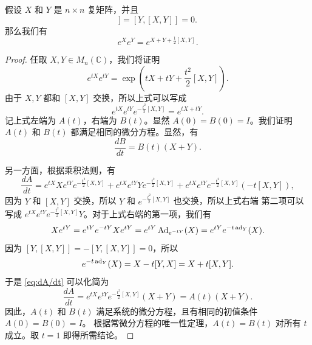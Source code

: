\begin{theorem}\label{thm:BCH-Heisenberg}
  假设 $X$ 和 $Y$ 是 $n\times n$ 复矩阵，并且
  \begin{equation}
    [X,[X,Y]]=[Y,[X,Y]]=0. \label{BCH-condition}
  \end{equation}
  那么我们有
  \[
    e^Xe^Y=e^{X+Y+\frac{1}{2}[X,Y]}.
  \]
\end{theorem}
\begin{proof}
  任取 $X,Y\in M_n(\mathbb{C})$，我们将证明
  \[
    e^{tX}e^{tY}=\exp\left(
      tX+tY+\frac{t^2}{2}[X,Y]
    \right).
  \]
  由于 $X,Y$ 都和 $[X,Y]$ 交换，所以上式可以写成
  \begin{equation}
    e^{tX}e^{tY}e^{-\frac{t^2}{2}[X,Y]}=e^{tX+tY}. \label{BCH-goal}
  \end{equation}
  记上式左端为 $A(t)$，右端为 $B(t)$。显然 $A(0)=B(0)=I$。我们证明
  $A(t)$ 和 $B(t)$ 都满足相同的微分方程。显然，有
  \[
    \frac{dB}{dt}= B(t)(X+Y).
  \]

  另一方面，根据乘积法则，有
  \begin{equation}\label{eq:dA/dt}
    \frac{d A}{dt}=e^{tX}Xe^{tY}e^{-\frac{t^2}{2}[X,Y]}+
    e^{tX}e^{tY}Ye^{-\frac{t^2}{2}[X,Y]}+
    e^{tX}e^{tY}e^{-\frac{t^2}{2}[X,Y]}\left(-t[X,Y]\right),
  \end{equation}
  因为 $Y$ 和 $[X,Y]$ 交换，所以 $Y$ 和 $e^{-\frac{t^2}{2}[X,Y]}$ 也交换，所以上式右端
  第二项可以写成 $e^{tX}e^{tY}e^{-\frac{t^2}{2}[X,Y]}Y$。对于上式右端的第一项，我们有
  \[
    Xe^{tY}=e^{tY}e^{-tY}Xe^{tY}=e^{tY}\operatorname{Ad}_{e^{-tY}}(X)
    =e^{tY}e^{-t\operatorname{ad}_Y}(X).
  \]
  因为 $[Y,[X,Y]]=-[Y,[X,Y]]=0$，所以
  \[
    e^{-t\operatorname{ad}_Y}(X)=X-t[Y,X]=X+t[X,Y].
  \]
  于是 \eqref{eq:dA/dt} 可以化简为 
  \[
    \frac{dA}{dt}=e^{tX}e^{tY}e^{-\frac{t^2}{2}[X,Y]}(X+Y)=A(t)(X+Y).
  \]
  因此，$A(t)$ 和 $B(t)$ 满足系统的微分方程，且有相同的初值条件 $A(0)=B(0)=I$。
  根据常微分方程的唯一性定理，$A(t)=B(t)$ 对所有 $t$ 成立。取 $t=1$ 即得所需结论。
\end{proof}


